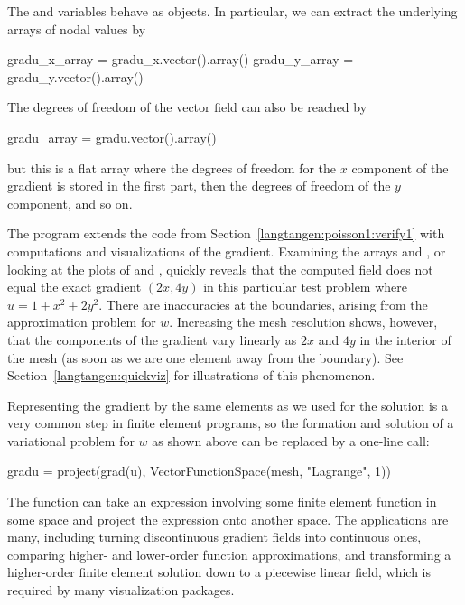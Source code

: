 The  and  variables behave as 
objects. In particular, we can extract the underlying arrays of nodal
values by 
\begin{python}
gradu_x_array = gradu_x.vector().array()
gradu_y_array = gradu_y.vector().array()
\end{python}
The degrees of freedom of the  vector field can also be
reached by 
\begin{python}
gradu_array = gradu.vector().array()
\end{python}
but this is a flat  array where the degrees of freedom for
the $x$ component of the gradient is stored in the first part, then the
degrees of freedom of the $y$ component, and so on.

The program  extends the code 
from Section~\ref{langtangen:poisson1:verify1} with computations
and visualizations of the gradient.  Examining the arrays
 and , or looking at the
plots of  and , quickly reveals that the
computed  field does not equal the exact gradient $(2x,
4y)$ in this particular test problem where $u=1+x^2+2y^2$.  There are
inaccuracies at the boundaries, arising from the approximation problem for
$w$. Increasing the mesh resolution shows, however, that the components
of the gradient vary linearly as $2x$ and $4y$ in the interior of
the mesh (as soon as we are one element away from the boundary). See
Section~\ref{langtangen:quickviz} for illustrations of this phenomenon.

Representing the gradient by the same elements as we used for the solution
is a very common step in finite element programs, so the formation and
solution of a variational problem for $w$ as shown above can be replaced
by a one-line call:
\begin{python}
gradu = project(grad(u), VectorFunctionSpace(mesh, "Lagrange", 1))
\end{python}
The  function can take an expression involving some finite
element function in some space and project the expression onto another
space.  The applications are many, including turning discontinuous
gradient fields into continuous ones, comparing higher- and lower-order
function approximations, and transforming a higher-order finite element
solution down to a piecewise linear field, which is required by many
visualization packages.

